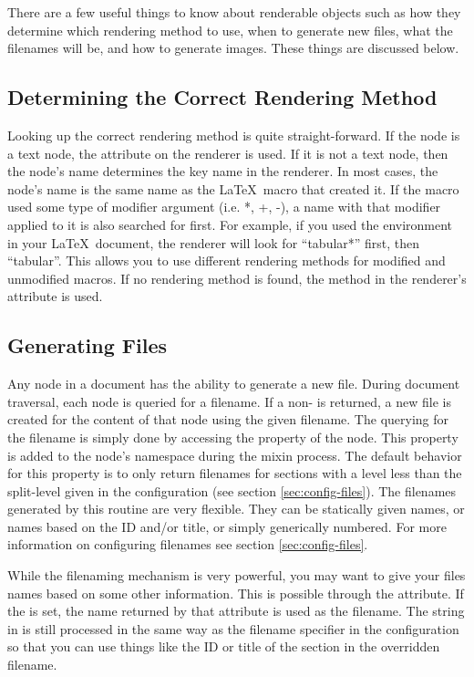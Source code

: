 There are a few useful things to know about renderable objects such as
how they determine which rendering method to use, when to generate new
files, what the filenames will be, and how to generate images.  These
things are discussed below.


\subsection{Determining the Correct Rendering Method}

Looking up the correct rendering method is quite straight-forward.  
If the node is a text node, the  attribute on 
the renderer is used.  If it is not a text node, then the node's name
determines the key name in the renderer.  In most cases, the node's
name is the same name as the \LaTeX\ macro that created it.  If the
macro used some type of modifier argument (i.e. *, +, -), a name 
with that modifier applied to it is also searched for first.  For example,
if you used the  environment in your \LaTeX\
document, the renderer will look for ``tabular*'' first, then ``tabular''.
This allows you to use different rendering methods for modified and
unmodified macros.  If no rendering method is found, the method
in the renderer's  attribute is used.


\subsection{Generating Files}

Any node in a document has the ability to generate a new file. 
During document traversal, each node is queried for a filename.  If
a non-\var{None} is returned, a new file is created for the content
of that node using the given filename.  The querying for the filename
is simply done by accessing the \member{filename} property of the
node.  This property is added to the node's namespace during the
mixin process.  The default behavior for this property is to only
return filenames for sections with a level less than the split-level
given in the configuration (see section \ref{sec:config-files}).
The filenames generated by this routine are very flexible.  They can 
be statically given names, or names based on the ID and/or title, 
or simply generically numbered.  For more information on configuring
filenames see section \ref{sec:config-files}.

While the filenaming mechanism is very powerful, you may want to give
your files names based on some other information.  This is possible through
the  attribute.  If the 
is set, the name returned by that attribute is used as the filename.
The string in \member{filenameoverride} is still processed in the same
way as the filename specifier in the configuration so that you can 
use things like the ID or title of the section in the overridden filename.

